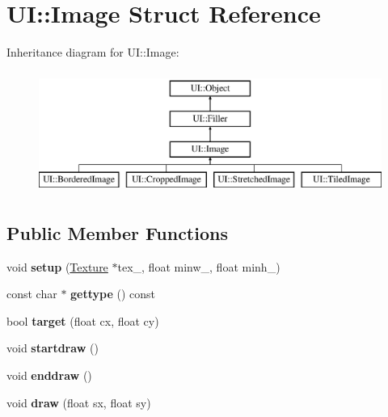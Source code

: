 \hypertarget{struct_u_i_1_1_image}{}\section{UI\+:\+:Image Struct Reference}
\label{struct_u_i_1_1_image}
Inheritance diagram for UI\+:\+:Image\+:\begin{figure}[H]
\begin{center}
\leavevmode
\includegraphics[height=4.000000cm]{struct_u_i_1_1_image}
\end{center}
\end{figure}
\subsection*{Public Member Functions}
\begin{DoxyCompactItemize}
\item 
\mbox{\label{struct_u_i_1_1_image_adaad02c5dfdfd6baeeca72a6b97c6c42}} 
void {\bfseries setup} (\hyperlink{struct_texture}{Texture} $\ast$tex\+\_\+, float minw\+\_, float minh\+\_)
\item 
\mbox{\label{struct_u_i_1_1_image_a400be8408bf163d0ef3a2c855fa148a6}} 
const char $\ast$ {\bfseries gettype} () const
\item 
\mbox{\label{struct_u_i_1_1_image_aac24f54874bbb3ec20c73016cf4f5e15}} 
bool {\bfseries target} (float cx, float cy)
\item 
\mbox{\label{struct_u_i_1_1_image_a53ce4581b3a2dfd1fe1ad20f92813887}} 
void {\bfseries startdraw} ()
\item 
\mbox{\label{struct_u_i_1_1_image_a2122f3db4fd12ff4376e806cc78cf479}} 
void {\bfseries enddraw} ()
\item 
\mbox{\label{struct_u_i_1_1_image_a7cafd73c107a837a68594875c225ab33}} 
void {\bfseries draw} (float sx, float sy)
\end{DoxyCompactItemize}
